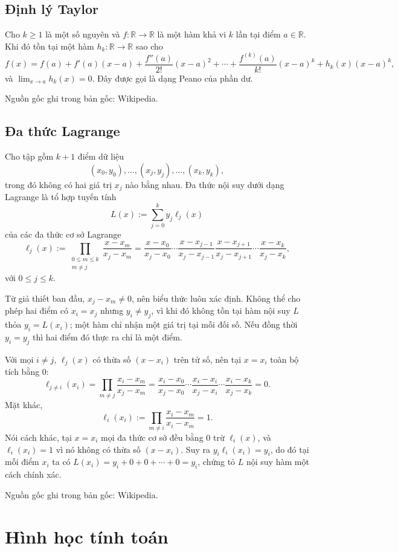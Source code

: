 \documentclass[11pt]{article}
\begin{document}
\subsection{Định lý Taylor}

Cho $k\ge 1$ là một số nguyên và $f:\mathbb{R}\to\mathbb{R}$ là một hàm khả vi
$k$ lần tại điểm $a\in\mathbb{R}$. Khi đó tồn tại một hàm
$h_k:\mathbb{R}\to\mathbb{R}$ sao cho
\[
  f(x)=f(a)+f'(a)(x-a)+\frac{f''(a)}{2!}(x-a)^2+\cdots+
       \frac{f^{(k)}(a)}{k!}(x-a)^k+h_k(x)(x-a)^k,
\]
và $\lim_{x\to a} h_k(x)=0$. Đây được gọi là dạng Peano của phần dư.

Nguồn gốc ghi trong bản gốc: Wikipedia.

\subsection{Đa thức Lagrange}

Cho tập gồm $k+1$ điểm dữ liệu
\[
  (x_0,y_0),\ldots,(x_j,y_j),\ldots,(x_k,y_k),
\]
trong đó không có hai giá trị $x_j$ nào bằng nhau. Đa thức nội suy dưới dạng
Lagrange là tổ hợp tuyến tính
\[
  L(x):=\sum_{j=0}^{k} y_j\ell_j(x)
\]
của các đa thức cơ sở Lagrange
\[
  \ell_j(x):=
  \prod_{\substack{0\le m\le k\\m\ne j}}\frac{x-x_m}{x_j-x_m}
  =
  \frac{x-x_0}{x_j-x_0}\cdots
  \frac{x-x_{j-1}}{x_j-x_{j-1}}
  \frac{x-x_{j+1}}{x_j-x_{j+1}}\cdots
  \frac{x-x_k}{x_j-x_k},
\]
với $0\le j\le k$.

Từ giả thiết ban đầu, $x_j-x_m\ne 0$, nên biểu thức luôn xác định. Không thể
cho phép hai điểm có $x_i=x_j$ nhưng $y_i\ne y_j$, vì khi đó không tồn tại hàm
nội suy $L$ thỏa $y_i=L(x_i)$; một hàm chỉ nhận một giá trị tại mỗi đối số.
Nếu đồng thời $y_i=y_j$ thì hai điểm đó thực ra chỉ là một điểm.

Với mọi $i\ne j$, $\ell_j(x)$ có thừa số $(x-x_i)$ trên tử số, nên tại
$x=x_i$ toàn bộ tích bằng $0$:
\[
  \ell_{j\ne i}(x_i)=
  \prod_{m\ne j}\frac{x_i-x_m}{x_j-x_m}
  =
  \frac{x_i-x_0}{x_j-x_0}\cdots
  \frac{x_i-x_i}{x_j-x_i}\cdots
  \frac{x_i-x_k}{x_j-x_k}=0.
\]
Mặt khác,
\[
  \ell_i(x_i):=\prod_{m\ne i}\frac{x_i-x_m}{x_i-x_m}=1.
\]
Nói cách khác, tại $x=x_i$ mọi đa thức cơ sở đều bằng $0$ trừ
$\ell_i(x)$, và $\ell_i(x_i)=1$ vì nó không có thừa số $(x-x_i)$.
Suy ra $y_i\ell_i(x_i)=y_i$, do đó tại mỗi điểm $x_i$ ta có
$L(x_i)=y_i+0+0+\cdots+0=y_i$, chứng tỏ $L$ nội suy hàm một cách chính xác.

Nguồn gốc ghi trong bản gốc: Wikipedia.

\section{Hình học tính toán}
\end{document}
